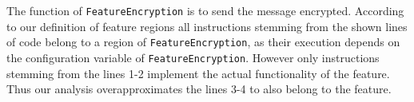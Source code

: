 \textsf{The function of \texttt{FeatureEncryption} is to send the message encrypted. According to our definition of feature regions all instructions stemming from the shown lines of code belong to a region of \texttt{FeatureEncryption}, as their execution depends on the configuration variable of \texttt{FeatureEncryption}. However only instructions stemming from the lines 1-2 implement the actual functionality of the feature. Thus our analysis overapproximates the lines 3-4 to also belong to the feature.} 
